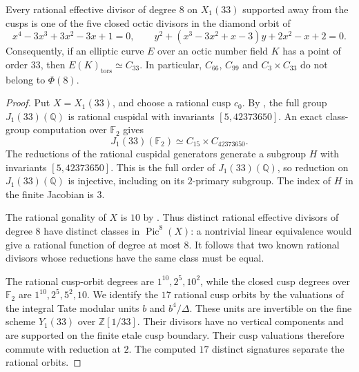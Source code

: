 \begin{proposition}\label{prop:all-octic-33}
Every rational effective divisor of degree $8$ on $X_1(33)$
supported away from the cusps is one of the five closed octic
divisors in the diamond orbit of
\[
 x^4-3x^3+3x^2-3x+1=0,\qquad
 y^2+(x^3-3x^2+x-3)y+2x^2-x+2=0.
\]
Consequently, if an elliptic curve $E$ over an octic number field $K$
has a point of order $33$, then $E(K)_{\mathrm{tors}}\simeq C_{33}$.
In particular, $C_{66}$, $C_{99}$ and $C_3\times C_{33}$ do not
belong to $\Phi(8)$.
\end{proposition}
\begin{proof}
Put $X=X_1(33)$, and choose a rational cusp $c_0$.
By \cite[Theorem~3.1(2), Theorem~4.13 and Table~2]{DEHMZ},
the full group $J_1(33)(\mathbb Q)$ is rational cuspidal with
invariants $[5,42373650]$.
An exact class-group computation over $\mathbb F_2$ gives
\[
 J_1(33)(\mathbb F_2)\simeq C_{15}\times C_{42373650}.
\]
The reductions of the rational cuspidal generators generate a subgroup
$H$ with invariants $[5,42373650]$. This is the full order of
$J_1(33)(\mathbb Q)$, so reduction on $J_1(33)(\mathbb Q)$ is
injective, including on its $2$-primary subgroup. The index of $H$
in the finite Jacobian is $3$.

The rational gonality of $X$ is $10$ by \cite[Table~1]{DvH}.
Thus distinct rational effective divisors of degree $8$ have distinct
classes in $\operatorname{Pic}^8(X)$: a nontrivial linear equivalence
would give a rational function of degree at most $8$.
It follows that two known rational divisors whose reductions have the
same class must be equal.

The rational cusp-orbit degrees are $1^{10},2^5,10^2$, while the
closed cusp degrees over $\mathbb F_2$ are $1^{10},2^5,5^2,10$.
We identify the $17$ rational cusp orbits by the valuations of the
integral Tate modular units $b$ and $b^4/\Delta$.
These units are invertible on the fine scheme $Y_1(33)$ over
$\mathbb Z[1/33]$. Their divisors have no vertical components and
are supported on the finite etale cusp boundary. Their cusp valuations
therefore commute with reduction at $2$.
The computed $17$ distinct signatures separate the rational orbits.


\end{proof}

